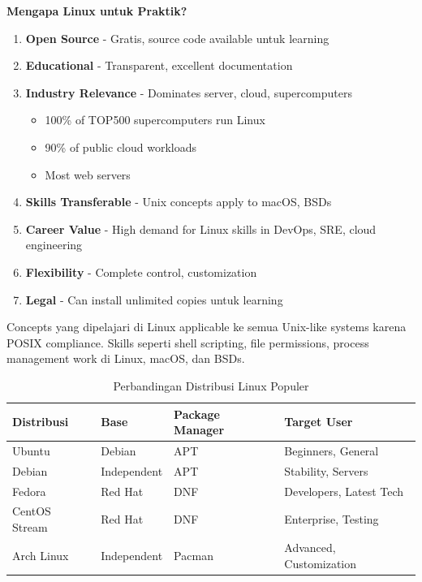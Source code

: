 \textbf{Mengapa Linux untuk Praktik?}

\begin{enumerate}
    \item \textbf{Open Source} - Gratis, source code available untuk learning
    \item \textbf{Educational} - Transparent, excellent documentation
    \item \textbf{Industry Relevance} - Dominates server, cloud, supercomputers
    \begin{itemize}
        \item 100\% of TOP500 supercomputers run Linux
        \item 90\% of public cloud workloads
        \item Most web servers
    \end{itemize}
    \item \textbf{Skills Transferable} - Unix concepts apply to macOS, BSDs
    \item \textbf{Career Value} - High demand for Linux skills in DevOps, SRE, cloud engineering
    \item \textbf{Flexibility} - Complete control, customization
    \item \textbf{Legal} - Can install unlimited copies untuk learning
\end{enumerate}

\begin{notebox}
Concepts yang dipelajari di Linux applicable ke semua Unix-like systems karena POSIX compliance. Skills seperti shell scripting, file permissions, process management work di Linux, macOS, dan BSDs.
\end{notebox}

\begin{table}[htbp]
    \centering
    \caption{Perbandingan Distribusi Linux Populer}
    \label{tab:linux-distros}
    \begin{tabular}{@{}llll@{}}
        \toprule
        \textbf{Distribusi} & \textbf{Base} & \textbf{Package Manager} & \textbf{Target User} \\
        \midrule
        Ubuntu & Debian & APT & Beginners, General \\
        Debian & Independent & APT & Stability, Servers \\
        Fedora & Red Hat & DNF & Developers, Latest Tech \\
        CentOS Stream & Red Hat & DNF & Enterprise, Testing \\
        Arch Linux & Independent & Pacman & Advanced, Customization \\
        \bottomrule
    \end{tabular}
\end{table}


